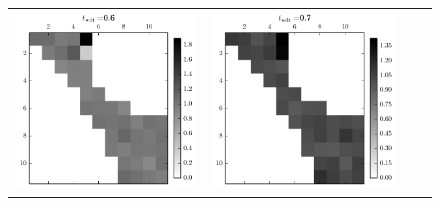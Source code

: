 \begin{figure}[h]
  \centering
  \begin{tabular}{cccc}
    \includegraphics[scale=0.75]{images/results/matshows/homog_sp0_matshow_5}
    &
    \includegraphics[scale=0.75]{images/results/matshows/homog_sp0_matshow_6}

\end{tabular}
\end{figure}
